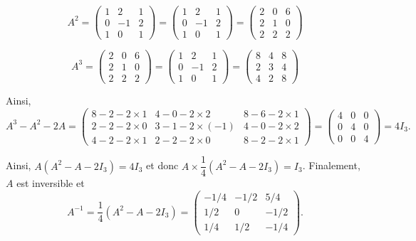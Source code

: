 \documentclass[11pt,fleqn]{book} %
\begin{document}
\begin{solution}\[A^2 =\begin{pmatrix}1 & 2 & 1\\0&-1&2\\1&0&1 \end{pmatrix}=\begin{pmatrix}1 & 2 & 1\\0&-1&2\\1&0&1 \end{pmatrix} = \begin{pmatrix}2& 0 & 6\\2&1&0\\2&2&2 \end{pmatrix}\]

\[A^3 =  \begin{pmatrix}2& 0 & 6\\2&1&0\\2&2&2 \end{pmatrix}=\begin{pmatrix}1 & 2 & 1\\0&-1&2\\1&0&1 \end{pmatrix}= \begin{pmatrix}8& 4 & 8\\2&3&4\\4&2&8 \end{pmatrix}\]

Ainsi, \[A^3-A^2-2A = \begin{pmatrix} 8-2-2 \times 1 & 4 -0 -2\times 2 & 8 -6-2 \times 1 \\ 2 -2-2\times 0 & 3 -1-2 \times(-1) & 4 -0 - 2\times 2 \\ 4-2-2\times 1 &2-2-2\times 0 & 8-2-2\times 1\end{pmatrix}= \begin{pmatrix}4&0&0\\0&4&0\\0&0&4\end{pmatrix}=4I_3.\]

Ainsi, \(A(A^2-A-2I_3)=4I_3\) et donc \(A \times \dfrac{1}{4}(A^2-A-2I_3)=I_3\). Finalement, \(A\) est inversible et
\[A^{-1}=\dfrac{1}{4}(A^2-A-2I_3)=\begin{pmatrix}-1/4 & -1/2 & 5/4 \\ 1/2 & 0 & -1/2 \\ 1/4 & 1/2 & -1/4\end{pmatrix}.\]\end{solution}
\end{document}
